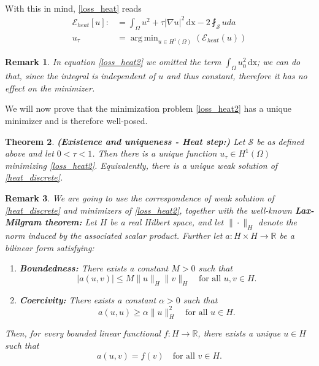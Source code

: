\documentclass[draft,12pt,openany]{book}
\newcommand{\R}{\mathbb{R}}
\theoremstyle{plainnormal}
\newtheorem{theorem}{Theorem}[section]
\newtheorem{remark}[theorem]{Remark}
\theoremstyle{remark}
\DeclareMathOperator*{\argmin}{arg\,min}
\begin{document}
\\
With this in mind, \cref{loss_heat} reads
\begin{align}\label{loss_heat2}
    \mathcal{E}_{heat}[u] :&= \int_\Omega u^2 + \tau |\nabla u|^2 \,\mathrm{dx} - 2\fint_\mathcal{S} u da\\
    u_\tau &= \argmin_{u\in H^1(\Omega)} (\mathcal{E}_{heat}(u))
\end{align}
\begin{remark}
    In equation \eqref{loss_heat2} we omitted the term $\int_\Omega u_0 ^2 \,\mathrm{dx}$; we can do that, since the integral is independent of $u$ and thus constant, therefore it has no effect on the minimizer. 
\end{remark}
We will now prove that the minimization problem \cref{loss_heat2} has a unique minimizer and is therefore well-posed.
\begin{theorem}\label{thm_exUniq_heat}{\textbf{(Existence and uniqueness - Heat step:)}}
Let $\mathcal{S}$ be as defined above and let $0 < \tau < 1$. Then there is a unique function $u_\tau \in H^1(\Omega)$ minimizing \cref{loss_heat2}. Equivalently, there is a unique weak solution of \eqref{heat_discrete}.
\end{theorem}
\begin{remark}
We are going to use the correspondence of weak solution of \cref{heat_discrete} and minimizers of \cref{loss_heat2}, together with the well-known \textbf{Lax-Milgram theorem:} Let \( H \) be a real Hilbert space, and let $\|\cdot\|_H$ denote the norm induced by the associated scalar product. Further let \( a : H \times H \to \mathbb{R} \) be a bilinear form satisfying:
\begin{enumerate}
  \item \textbf{Boundedness:} There exists a constant \( M > 0 \) such that
  \[
  |a(u, v)| \leq M \|u\|_H \|v\|_H \quad \text{for all } u, v \in H.
  \]
  
  \item \textbf{Coercivity:} There exists a constant \( \alpha > 0 \) such that
  \[
  a(u, u) \geq \alpha \|u\|_H^2 \quad \text{for all } u \in H.
  \]
\end{enumerate}
Then, for every bounded linear functional \( f : H \rightarrow\R \), there exists a unique \( u \in H \) such that
\[
a(u, v) = f(v) \quad \text{for all } v \in H.
\]
\end{remark}
\end{document}
